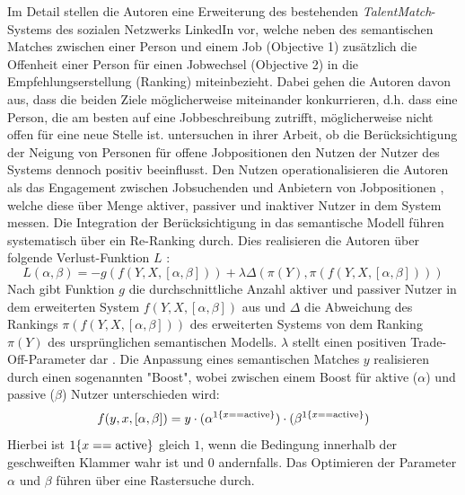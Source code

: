 Im Detail stellen die Autoren eine Erweiterung des bestehenden \textit{TalentMatch}-Systems des sozialen Netzwerks LinkedIn vor, welche neben des semantischen Matches \cite[S. 2]{jannach:2:inproceedings} zwischen einer Person und einem Job (Objective 1) zusätzlich die Offenheit einer Person für einen Jobwechsel (Objective 2) in die Empfehlungserstellung (Ranking) miteinbezieht.
Dabei gehen die Autoren davon aus, dass die beiden Ziele möglicherweise miteinander konkurrieren, d.h. dass eine Person, die am besten auf eine Jobbeschreibung zutrifft, möglicherweise nicht offen für eine neue Stelle ist.
\textcite[S. 12]{rodriguez:inproceedings} untersuchen in ihrer Arbeit, ob die Berücksichtigung der Neigung von Personen für offene Jobpositionen den Nutzen der Nutzer des Systems dennoch positiv beeinflusst.
Den Nutzen operationalisieren die Autoren als das Engagement zwischen Jobsuchenden und Anbietern von Jobpositionen \cite[S. 14]{rodriguez:inproceedings}, welche diese über Menge aktiver, passiver und inaktiver Nutzer in dem System messen.
Die Integration der Berücksichtigung in das semantische Modell führen \textcite[S. 15]{rodriguez:inproceedings} systematisch über ein Re-Ranking durch.
Dies realisieren die Autoren über folgende Verlust-Funktion $L$ \cite[S. 13]{rodriguez:inproceedings}:
\begin{equation}\label{eq30}
    L(\alpha ,\beta) = -g(f(Y, X, [\alpha , \beta])) + \lambda \Delta (\pi (Y), \pi (f(Y,X,[\alpha ,\beta])))
\end{equation}
Nach \textcite[S. 15]{rodriguez:inproceedings} gibt Funktion $g$ die durchschnittliche Anzahl aktiver und passiver Nutzer in dem erweiterten System $f(Y, X, [\alpha , \beta])$ aus und $\Delta$ die Abweichung des Rankings $\pi (f(Y,X,[\alpha ,\beta]))$ des erweiterten Systems von dem Ranking $\pi (Y)$ des ursprünglichen semantischen Modells.
$\lambda$ stellt einen positiven Trade-Off-Parameter dar \cite[S. 13]{rodriguez:inproceedings}.
Die Anpassung eines semantischen Matches $y$ realisieren \textcite[S. 15]{rodriguez:inproceedings} durch einen sogenannten "Boost", wobei zwischen einem Boost für aktive ($\alpha$) und passive ($\beta$) Nutzer unterschieden wird:
\begin{equation}\label{eq31}
    f(y,x,[\alpha ,\beta]) = y \cdot (\alpha^{1\{{x == \textnormal{active}\}}}) \cdot (\beta^{1\{{x == \textnormal{active}\}}})
\end{equation}
Hierbei ist $1\{x == \textnormal{active}\}$ gleich $1$, wenn die Bedingung innerhalb der geschweiften Klammer wahr ist und $0$ andernfalls.
Das Optimieren der Parameter $\alpha$ und $\beta$ führen \textcite[S. 15]{rodriguez:inproceedings} über eine Rastersuche durch.

